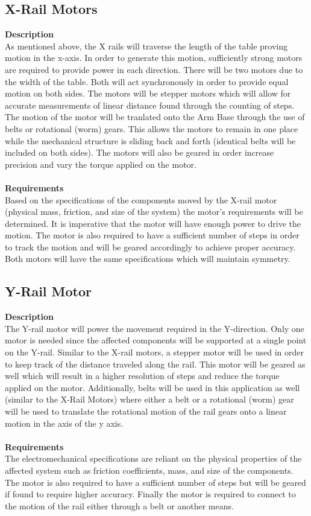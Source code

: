 \documentclass[titlepage]{article}
\begin{document}
\subsection{X-Rail Motors}
\textbf{Description}\\
As mentioned above, the X rails will traverse the length of the table proving motion in the x-axis. In order to generate this motion, sufficiently strong motors are required to provide power in each direction. There will be two motors due to the width of the table. Both will act synchronously in order to provide equal motion on both sides. The motors will be stepper motors which will allow for accurate measurements of linear distance found through the counting of steps. The motion of the motor will be tranlated onto the Arm Base through the use of belts or rotational (worm) gears. This allows the motors to remain in one place while the mechanical structure is sliding back and forth (identical belts will be included on both sides). The motors will also be geared in order increase precision and vary the torque applied on the motor.\\\\
\textbf{Requirements}\\
Based on the specifications of the components moved by the X-rail motor (physical mass, friction, and size of the system) the motor's requirements will be determined. It is imperative that the motor will have enough power to drive the motion. The motor is also required to have a sufficient number of steps in order to track the motion and will be geared accordingly to achieve proper accuracy. Both motors will have the same specifications which will maintain symmetry. 

\subsection{Y-Rail Motor}
\textbf{Description}\\
The Y-rail motor will power the movement required in the Y-direction. Only one motor is needed since the affected components will be supported at a single point on the Y-rail. Similar to the X-rail motors, a stepper motor will be used in order to keep track of the distance traveled along the rail. This motor will be geared as well which will result in a higher resolution of steps and reduce the torque applied on the motor. Additionally, belts will be used in this application as well (similar to the X-Rail Motors) where either a belt or a rotational (worm) gear will be used to translate the rotational motion of the rail gears onto a linear motion in the axis of the y axis.\\\\
\textbf{Requirements}\\
The electromechanical specifications are reliant on the physical properties of the affected system such as friction coefficients, mass, and size of the components. The motor is also required to have a sufficient number of steps but will be geared if found to require higher accuracy. Finally the motor is required to connect to the motion of the rail either through a belt or another means.
\end{document}
